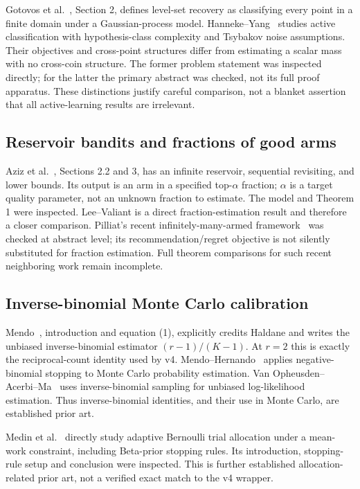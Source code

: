 \documentclass[11pt]{article}
\theoremstyle{definition}\newtheorem{conjecture}[theorem]{Conjecture}
\theoremstyle{remark}\newtheorem{remark}[theorem]{Remark}
\begin{document}
Gotovos et al.~\cite{gotovos}, Section 2, defines level-set recovery as classifying every point in a finite domain under a Gaussian-process model. Hanneke--Yang~\cite{hanneke} studies active classification with hypothesis-class complexity and Tsybakov noise assumptions. Their objectives and cross-point structures differ from estimating a scalar mass with no cross-coin structure. The former problem statement was inspected directly; for the latter the primary abstract was checked, not its full proof apparatus. These distinctions justify careful comparison, not a blanket assertion that all active-learning results are irrelevant.

\subsection{Reservoir bandits and fractions of good arms}
Aziz et al.~\cite{aziz}, Sections 2.2 and 3, has an infinite reservoir, sequential revisiting, and lower bounds. Its output is an arm in a specified top-$\alpha$ fraction; $\alpha$ is a target quality parameter, not an unknown fraction to estimate. The model and Theorem 1 were inspected. Lee--Valiant is a direct fraction-estimation result and therefore a closer comparison. Pilliat's recent infinitely-many-armed framework~\cite{pilliat} was checked at abstract level; its recommendation/regret objective is not silently substituted for fraction estimation. Full theorem comparisons for such recent neighboring work remain incomplete.

\subsection{Inverse-binomial Monte Carlo calibration}
Mendo~\cite{mendo}, introduction and equation (1), explicitly credits Haldane and writes the unbiased inverse-binomial estimator $(r-1)/(K-1)$. At $r=2$ this is exactly the reciprocal-count identity used by v4. Mendo--Hernando~\cite{mendoh} applies negative-binomial stopping to Monte Carlo probability estimation. Van Opheusden--Acerbi--Ma~\cite{ibs} uses inverse-binomial sampling for unbiased log-likelihood estimation. Thus inverse-binomial identities, and their use in Monte Carlo, are established prior art.

Medin et al.~\cite{medin} directly study adaptive Bernoulli trial allocation under a mean-work constraint, including Beta-prior stopping rules. Its introduction, stopping-rule setup and conclusion were inspected. This is further established allocation-related prior art, not a verified exact match to the v4 wrapper.
\end{document}

